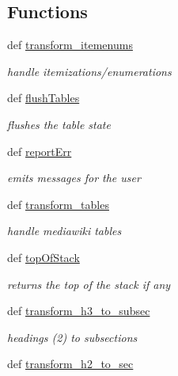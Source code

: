\subsection*{\-Functions}
\begin{DoxyCompactItemize}
\item 
def \hyperlink{namespaceuicilibris_1_1transform2book_a4cf4bffa54abd1c9570d2dd58c203d44}{transform\-\_\-itemenums}
\begin{DoxyCompactList}\small\item\em handle itemizations/enumerations \end{DoxyCompactList}\item 
def \hyperlink{namespaceuicilibris_1_1transform2book_a7b1b336762259ca843b8d8dfd695dd23}{flush\-Tables}
\begin{DoxyCompactList}\small\item\em flushes the table state \end{DoxyCompactList}\item 
def \hyperlink{namespaceuicilibris_1_1transform2book_a9a906578a0b55622178fdba1072e401e}{report\-Err}
\begin{DoxyCompactList}\small\item\em emits messages for the user \end{DoxyCompactList}\item 
def \hyperlink{namespaceuicilibris_1_1transform2book_a6f184c9a3e65ab33b63b0c7828ce923a}{transform\-\_\-tables}
\begin{DoxyCompactList}\small\item\em handle mediawiki tables \end{DoxyCompactList}\item 
def \hyperlink{namespaceuicilibris_1_1transform2book_a66287fce1c93a0e5931d54035dcfb379}{top\-Of\-Stack}
\begin{DoxyCompactList}\small\item\em returns the top of the stack if any \end{DoxyCompactList}\item 
def \hyperlink{namespaceuicilibris_1_1transform2book_a971d3c1ce00d938fb739370286d558ad}{transform\-\_\-h3\-\_\-to\-\_\-subsec}
\begin{DoxyCompactList}\small\item\em headings (2) to subsections \end{DoxyCompactList}\item 
def \hyperlink{namespaceuicilibris_1_1transform2book_a64518fc2fd5bb9b1e55e29fa5b28b260}{transform\-\_\-h2\-\_\-to\-\_\-sec}

\end{DoxyCompactItemize}
